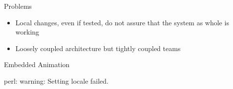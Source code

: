 \begin{frame}{Problems}
  \begin{itemize}
    [<+->]
    \item Local changes, even if tested, do not assure that the system as whole is working
    \item Loosely coupled architecture but tightly coupled teams
  \end{itemize}
\end{frame}

\begin{frame}{Embedded Animation}
\end{frame}perl: warning: Setting locale failed.

